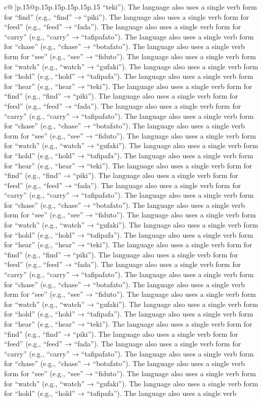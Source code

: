 \documentclass{article}
\begin{document}
{\begin{supertabular}{c@{$\;$}|p{.15\linewidth}@{}p{.15\linewidth}p{.15\linewidth}p{.15\linewidth}p{.15\linewidth}p{.15\linewidth}}
{{{“teki”). The language also uses a single verb form for “find” (e.g., “find” → “piki”). The language also uses a single verb form for “feed” (e.g., “feed” → “fada”). The language also uses a single verb form for “carry” (e.g., “carry” → “tafipafato”). The language also uses a single verb form for “chase” (e.g., “chase” → “botafato”). The language also uses a single verb form for “see” (e.g., “see” → “fiduto”). The language also uses a single verb form for “watch” (e.g., “watch” → “gufaki”). The language also uses a single verb form for “hold” (e.g., “hold” → “tafipafa”). The language also uses a single verb form for “hear” (e.g., “hear” → “teki”). The language also uses a single verb form for “find” (e.g., “find” → “piki”). The language also uses a single verb form for “feed” (e.g., “feed” → “fada”). The language also uses a single verb form for “carry” (e.g., “carry” → “tafipafato”). The language also uses a single verb form for “chase” (e.g., “chase” → “botafato”). The language also uses a single verb form for “see” (e.g., “see” → “fiduto”). The language also uses a single verb form for “watch” (e.g., “watch” → “gufaki”). The language also uses a single verb form for “hold” (e.g., “hold” → “tafipafa”). The language also uses a single verb form for “hear” (e.g., “hear” → “teki”). The language also uses a single verb form for “find” (e.g., “find” → “piki”). The language also uses a single verb form for “feed” (e.g., “feed” → “fada”). The language also uses a single verb form for “carry” (e.g., “carry” → “tafipafato”). The language also uses a single verb form for “chase” (e.g., “chase” → “botafato”). The language also uses a single verb form for “see” (e.g., “see” → “fiduto”). The language also uses a single verb form for “watch” (e.g., “watch” → “gufaki”). The language also uses a single verb form for “hold” (e.g., “hold” → “tafipafa”). The language also uses a single verb form for “hear” (e.g., “hear” → “teki”). The language also uses a single verb form for “find” (e.g., “find” → “piki”). The language also uses a single verb form for “feed” (e.g., “feed” → “fada”). The language also uses a single verb form for “carry” (e.g., “carry” → “tafipafato”). The language also uses a single verb form for “chase” (e.g., “chase” → “botafato”). The language also uses a single verb form for “see” (e.g., “see” → “fiduto”). The language also uses a single verb form for “watch” (e.g., “watch” → “gufaki”). The language also uses a single verb form for “hold” (e.g., “hold” → “tafipafa”). The language also uses a single verb form for “hear” (e.g., “hear” → “teki”). The language also uses a single verb form for “find” (e.g., “find” → “piki”). The language also uses a single verb form for “feed” (e.g., “feed” → “fada”). The language also uses a single verb form for “carry” (e.g., “carry” → “tafipafato”). The language also uses a single verb form for “chase” (e.g., “chase” → “botafato”). The language also uses a single verb form for “see” (e.g., “see” → “fiduto”). The language also uses a single verb form for “watch” (e.g., “watch” → “gufaki”). The language also uses a single verb form for “hold” (e.g., “hold” → “tafipafa”). The language also uses a single verb }}}
\end{supertabular}}
\end{document}
